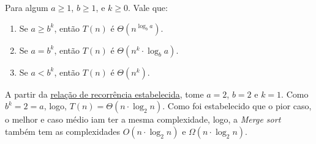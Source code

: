 Para algum $a \geq 1$, $b \geq 1$, e $k \geq 0$. Vale que:

\begin{enumerate}
	\item Se $a \geq b^k$, então $T(n)$ é $\Theta(n^{\log_b a})$.
	\item Se $a = b^k$, então $T(n)$ é $\Theta(n^k \cdot \log_b a)$.
	\item Se $a < b^k$, então $T(n)$ é $\Theta(n^k)$.
\end{enumerate}

A partir da \href{recc:rec_merge_sort}{relação de recorrência estabelecida}, tome $a = 2$, $b = 2$ e $k = 1$. Como $b^k = 2 = a$, logo, $T(n) = \Theta(n \cdot \log_2 n)$. Como foi estabelecido que o pior caso, o melhor e caso médio iam ter a mesma complexidade, logo, a \textit{Merge sort} também tem as complexidades $O(n \cdot \log_2 n)$ e $\Omega(n \cdot \log_2 n)$.

